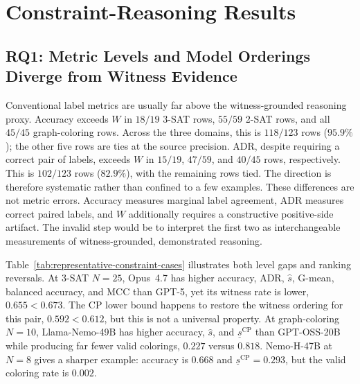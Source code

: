 \documentclass[acmsmall,screen,review,anonymous]{acmart}
\providecommand{\WitnessRate}{W}
\providecommand{\SepPoint}{\widehat{s}}
\providecommand{\SepCP}{\underline{s}^{\mathrm{CP}}}
\begin{document}
\section{Constraint-Reasoning Results}
\label{sec:constraint-results}

\subsection{RQ1: Metric Levels and Model Orderings Diverge from Witness Evidence}
\label{sec:constraint-rq1}

Conventional label metrics are usually far above the witness-grounded
reasoning proxy. Accuracy exceeds \(\WitnessRate\) in \(18/19\) 3-SAT rows,
\(55/59\) 2-SAT rows, and all \(45/45\) graph-coloring rows. Across the three
domains, this is \(118/123\) rows (\(95.9\%\)); the other five rows are ties at
the source precision. ADR, despite requiring a correct pair of labels, exceeds
\(\WitnessRate\) in \(15/19\), \(47/59\), and \(40/45\) rows, respectively.
This is \(102/123\) rows (\(82.9\%\)), with the remaining rows tied. The
direction is therefore systematic rather than confined to a few examples.
These differences are not metric errors. Accuracy measures marginal label
agreement, ADR measures correct paired labels, and \(\WitnessRate\)
additionally requires a constructive positive-side artifact. The invalid step
would be to interpret the first two as interchangeable measurements of
witness-grounded, demonstrated reasoning.

Table~\ref{tab:representative-constraint-cases} illustrates both level gaps
and ranking reversals. At 3-SAT \(N=25\), Opus~4.7 has higher accuracy, ADR,
\(\SepPoint\), G-mean, balanced accuracy, and MCC than GPT-5, yet its witness
rate is lower, \(0.655<0.673\). The CP lower bound happens to restore the
witness ordering for this pair, \(0.592<0.612\), but this is not a universal
property. At graph-coloring \(N=10\), Llama-Nemo-49B has higher accuracy,
\(\SepPoint\), and \(\SepCP\) than GPT-OSS-20B while producing far fewer
valid colorings, \(0.227\) versus \(0.818\). Nemo-H-47B at \(N=8\) gives a
sharper example: accuracy is \(0.668\) and \(\SepCP=0.293\), but the valid
coloring rate is \(0.002\).
\end{document}
